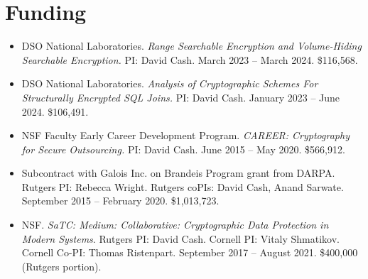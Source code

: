 \section*{Funding}

\begin{itemize}

\item DSO National Laboratories.
        \emph{Range Searchable Encryption and Volume-Hiding Searchable
        Encryption.}
        PI: David Cash.
        March 2023 -- March 2024. \$116,568.


    \item DSO National Laboratories.
        \emph{Analysis of Cryptographic Schemes
        For Structurally Encrypted SQL Joins.}
        PI: David Cash.
        January 2023 -- June 2024. \$106,491.


\item  
 NSF Faculty Early Career Development Program.  
 \emph{CAREER: Cryptography for Secure Outsourcing.}
 PI: David Cash.
 June 2015 -- May 2020.
 \$566,912.

\item Subcontract with Galois Inc. on Brandeis Program
grant from DARPA.  Rutgers PI:  Rebecca Wright.  Rutgers coPIs:  David Cash, Anand Sarwate.  September 2015 -- February 2020.  \$1,013,723.


\item  
 NSF.
 \emph{SaTC: Medium: Collaborative: Cryptographic Data Protection in Modern Systems}.
 Rutgers PI: David Cash.  Cornell PI: Vitaly Shmatikov.  Cornell Co-PI:  Thomas Ristenpart.
 September 2017 -- August 2021. \$400,000 (Rutgers portion).  
\end{itemize}

